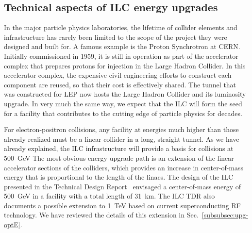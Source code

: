 

\subsection{Technical aspects of ILC energy upgrades}
\label{subsec:highE:tech}

In the major particle physics laboratories, the lifetime of collider elements
and infrastructure has rarely been  limited to the scope of the project they were
designed and built for. A famous example is the Proton Synchrotron at CERN.
Initially commissioned in 1959, it is still in operation as
part of the accelerator complex that prepares protons for injection in the
Large Hadron Collider. In this accelerator complex, the  expensive civil engineering
efforts to construct each component are reused, so that their cost is effectively shared. The tunnel
that was constructed for LEP now hosts the Large Hadron Collider and its
luminosity upgrade. In very much the same way, we
expect  that the ILC will  form the seed for a facility that contributes to the
cutting edge of particle physics for decades.


For electron-positron collisions, any facility at energies much higher than
those already realized must be a linear collider in a long, straight
tunnel.
As we have already explained, 
the ILC infrastructure will provide a basis for collisions at 500~GeV
The most obvious energy upgrade path is an extension of the linear
accelerator sections of the colliders, which provides an increase
in center-of-mass energy that is proportional to the length of the linacs.
The design of the ILC presented in the Technical Design
Report~\cite{Behnke:2013xla,Adolphsen:2013jya,Adolphsen:2013kya} envisaged a
center-of-mass energy of 500~GeV{} in a facility with a total length of 31~km.
The ILC TDR also documents
a possible extension to 1~TeV based on current superconducting RF
technology.  We have reviewed the details of this extension 
 in 
Sec.~\ref{subsubsec:upg-optE}.


